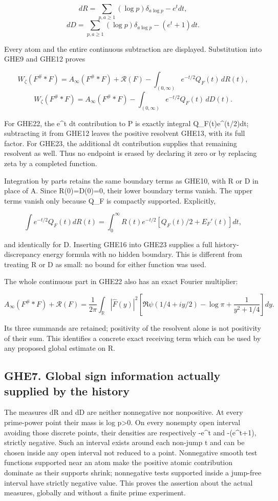 \[
dR=\sum_{p,a\ge1}(\log p)\delta_{a\log p}-e^t dt,
\] \[
dD=\sum_{p,a\ge1}(\log p)\delta_{a\log p}-(e^t+1)dt.
\tag{GHE21}
\]

Every atom and the entire continuous subtraction are displayed.
Substitution into GHE9 and GHE12 proves

\[
\boxed{W_\zeta(F^\#*F)
=A_\infty(F^\#*F)+\mathcal R(F)
-\int_{(0,\infty)}e^{-t/2}Q_F(t)\,dR(t),}
\tag{GHE22}
\] \[
\boxed{W_\zeta(F^\#*F)
=A_\infty(F^\#*F)
-\int_{(0,\infty)}e^{-t/2}Q_F(t)\,dD(t).}
\tag{GHE23}
\]

For GHE22, the e\^{}t dt contribution to P is exactly integral
Q\_F(t)e\^{}(t/2)dt; subtracting it from GHE12 leaves the positive
resolvent GHE13, with its full factor. For GHE23, the additional dt
contribution supplies that remaining resolvent as well. Thus no endpoint
is erased by declaring it zero or by replacing zeta by a completed
function.

Integration by parts retains the same boundary terms as GHE10, with R or
D in place of A. Since R(0)=D(0)=0, their lower boundary terms vanish.
The upper terms vanish only because Q\_F is compactly supported.
Explicitly,

\[
\int e^{-t/2}Q_F(t)dR(t)
=\int_0^\infty R(t)e^{-t/2}
\left[Q_F(t)/2+E_F'(t)\right]dt,
\tag{GHE24}
\]

and identically for D. Inserting GHE16 into GHE23 supplies a full
history-discrepancy energy formula with no hidden boundary. This is
different from treating R or D as small: no bound for either function
was used.

The whole continuous part in GHE22 also has an exact Fourier multiplier:

\[
A_\infty(F^\#*F)+\mathcal R(F)
=\frac1{2\pi}\int_{\mathbb R}|\widehat F(y)|^2
\left[\Re\psi(1/4+iy/2)-\log\pi+
\frac1{y^2+1/4}\right]dy.
\tag{GHE25}
\]

Its three summands are retained; positivity of the resolvent alone is
not positivity of their sum. This identifies a concrete exact receiving
term which can be used by any proposed global estimate on R.

\subsection{GHE7. Global sign information actually supplied by the
history}\label{ghe7.-global-sign-information-actually-supplied-by-the-history}

The measures dR and dD are neither nonnegative nor nonpositive. At every
prime-power point their mass is log p\textgreater0. On every nonempty
open interval avoiding those discrete points, their densities are
respectively -e\^{}t and -(e\^{}t+1), strictly negative. Such an
interval exists around each non-jump t and can be chosen inside any open
interval not reduced to a point. Nonnegative smooth test functions
supported near an atom make the positive atomic contribution dominate as
their supports shrink; nonnegative tests supported inside a jump-free
interval have strictly negative value. This proves the assertion about
the actual measures, globally and without a finite prime experiment.

